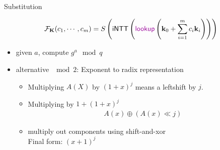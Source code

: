 \documentclass[10pt]{beamer}
\newcommand{\kkk}{\mathbf{k}}
\newcommand{\intt}{\mathsf{iNTT}}
\newcommand{\bv}[1]{\mathbf{#1}}
\begin{document}
 \begin{frame}{Substitution}
   \vspace*{-2em}
   \begin{figure}[H]
     \begin{align*}
       \mathcal{F}_{\bv{K}}(c_1, \cdots, c_m) = S\left(
         \intt\left(
           {\color{colA} \mathsf{lookup}}\left(
             \kkk_0 + \sum_{i=1}^m {c_i}\kkk_{i}
           \right)
         \right)
       \right)
     \end{align*}
   \end{figure}
   \begin{itemize}
     \item given $a$, compute $g^a\mod q$
     \item alternative $\mod 2$: Exponent to radix representation
   \begin{itemize}
    \item Multiplying $A(X)$ by $(1+x)^j$ means a leftshift by $j$.\pause
       \item 
         Multiplying by $1+(1+x)^j$
         \begin{align*}
           A(x)\oplus (A(x)\ll j)
         \end{align*}
       \item multiply out components using shift-and-xor\pause \\
         Final form: $(x+1)^j$
   \end{itemize}

   \end{itemize}
 \end{frame}
\end{document}

